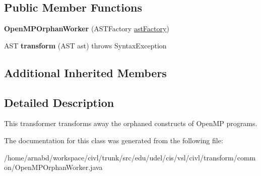 \subsection*{Public Member Functions}
\begin{DoxyCompactItemize}
\item 
\hypertarget{classedu_1_1udel_1_1cis_1_1vsl_1_1civl_1_1transform_1_1common_1_1OpenMPOrphanWorker_a1aeb0c27bfd370329a679eb6c242a58e}{}{\bfseries Open\+M\+P\+Orphan\+Worker} (A\+S\+T\+Factory \hyperlink{classedu_1_1udel_1_1cis_1_1vsl_1_1civl_1_1transform_1_1common_1_1BaseWorker_a44812bb476e4511fb6ca29a808427186}{ast\+Factory})\label{classedu_1_1udel_1_1cis_1_1vsl_1_1civl_1_1transform_1_1common_1_1OpenMPOrphanWorker_a1aeb0c27bfd370329a679eb6c242a58e}

\item 
\hypertarget{classedu_1_1udel_1_1cis_1_1vsl_1_1civl_1_1transform_1_1common_1_1OpenMPOrphanWorker_a70e1c11e1c8c6a62ada8b1789204ffde}{}A\+S\+T {\bfseries transform} (A\+S\+T ast)  throws Syntax\+Exception \label{classedu_1_1udel_1_1cis_1_1vsl_1_1civl_1_1transform_1_1common_1_1OpenMPOrphanWorker_a70e1c11e1c8c6a62ada8b1789204ffde}

\end{DoxyCompactItemize}
\subsection*{Additional Inherited Members}


\subsection{Detailed Description}
This transformer transforms away the orphaned constructs of Open\+M\+P programs. 

The documentation for this class was generated from the following file\+:\begin{DoxyCompactItemize}
\item 
/home/arnabd/workspace/civl/trunk/src/edu/udel/cis/vsl/civl/transform/common/Open\+M\+P\+Orphan\+Worker.\+java\end{DoxyCompactItemize}
